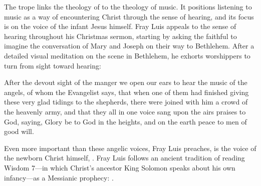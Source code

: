 The  trope links the theology of  to
the theology of music.
It positions listening to music as a way of encountering Christ through the
sense of hearing, and its focus is on the voice of the infant Jesus himself.
Fray Luis appeals to the sense of hearing throughout his Christmas sermon,
starting by asking the faithful to imagine the conversation of Mary and Joseph
on their way to Bethlehem.
After a detailed visual meditation on the scene in Bethlehem, he exhorts
worshippers to turn from sight toward hearing:
\begin{quoting}
    After the devout sight of the manger we open our ears to hear the music of
    the angels, of whom the Evangelist says, that when one of them had finished
    giving these very glad tidings to the shepherds, there were joined with him
    a crowd of the heavenly army, and that they all in one voice sang upon the
    airs praises to God, saying, Glory be to God in the heights, and on the
    earth peace to men of good will.%
        \Autocite[40]{LuisdeGranada:Xmas}
\end{quoting}
Even more important than these angelic voices, Fray Luis preaches, is the voice
of the newborn Christ himself, .
Fray Luis follows an ancient tradition of reading Wisdom 7---in which Christ's
ancestor King Solomon speaks about his own infancy---as a Messianic prophecy:
.%
    \Autocites[37--38]{LuisdeGranada:Xmas}
    [Cf.][670, on .]{Lapide:Gospels19C}


